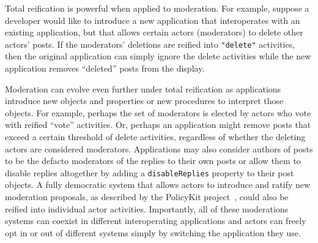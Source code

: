 
Total reification is powerful when applied to moderation.
For example, suppose a developer would like to introduce a new application
that interoperates with an existing application,
but that allows certain actors (moderators) to delete other actors' posts.
If the moderators' deletions are reified into \texttt{"delete"} activities,
then the original application can simply ignore the delete activities
while the new application removes ``deleted'' posts from the display.

Moderation can evolve even further under total reification
as applications introduce new objects and properties
or new procedures to interpret those objects.
For example,
perhaps the set of moderators is elected by actors who vote with reified ``vote'' activities.
Or, perhaps an application might remove posts that exceed a certain threshold of delete activities,
regardless of whether the deleting actors are considered moderators.
Applications may also consider authors of posts to be the defacto moderators of the replies to their
own posts or allow them to disable replies altogether by adding a \texttt{disableReplies}
property to their post objects.
A fully democratic system that allows actors to introduce and ratify new moderation proposals,
as described by the PolicyKit project~\cite{policykit}, could also be reified into
individual actor activities.
Importantly, all of these moderations systems can coexist in different interoperating
applications and actors can freely opt in or out of different systems simply by switching
the application they use.




